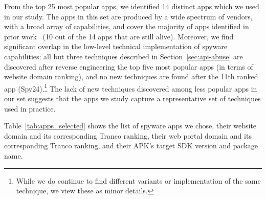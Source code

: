 From the top 25 most popular apps, we identified 14 distinct apps which we used in our study. The apps in this set are produced by a wide spectrum of vendors, with a broad array of capabilities, and cover the majority of apps identified in prior work~\cite{chatterjee2018spyware} (10 out of the 14 apps that are still alive). Moreover, we find significant overlap in the low-level technical implementation of spyware capabilities:  all but three techniques described in Section~\ref{sec:api-abuse} are discovered after reverse engineering the top five most popular apps (in terms of website domain ranking), and no new techniques are found after the 11th ranked app (Spy24).\footnote{While we do continue to find different variants or implementation of the same technique, we view these as minor details.}
The lack of new techniques discovered among less popular apps in our set suggests that the apps we study capture a representative set of techniques used in practice.


Table~\ref{tab:apps_selected} shows the list of spyware apps we chose, their website domain and its corresponding Tranco ranking, their web portal domain and its corresponding Tranco ranking, and their APK's target SDK version and package name.

